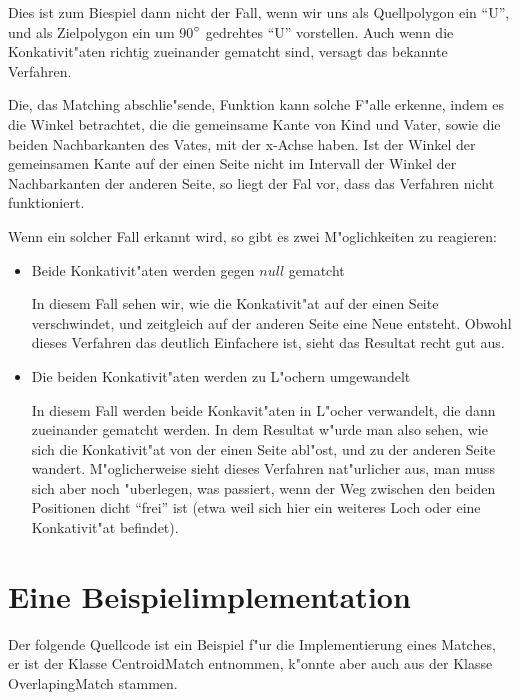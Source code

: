 Dies ist zum Biespiel dann nicht der Fall, wenn wir uns als Quellpolygon ein "`U"', und als Zielpolygon ein um 90$\degree$ gedrehtes "`U"' vorstellen. Auch wenn die Konkativit"aten richtig zueinander gematcht sind, versagt das bekannte Verfahren.

Die, das Matching abschlie"sende, Funktion kann solche F"alle erkenne, indem es die Winkel betrachtet, die die gemeinsame Kante von Kind und Vater, sowie die beiden Nachbarkanten des Vates, mit der x-Achse haben. Ist der Winkel der gemeinsamen Kante auf der einen Seite nicht im  Intervall der Winkel der Nachbarkanten der anderen Seite, so liegt der Fal vor, dass das Verfahren nicht funktioniert.

Wenn ein solcher Fall erkannt wird, so gibt es zwei M"oglichkeiten zu reagieren:
\begin{itemize}
\item Beide Konkativit"aten werden gegen $null$ gematcht

In diesem Fall sehen wir, wie die Konkativit"at auf der einen Seite verschwindet, und zeitgleich auf der anderen Seite eine Neue entsteht. Obwohl dieses Verfahren das deutlich Einfachere ist, sieht das Resultat recht gut aus.

\item Die beiden Konkativit"aten werden zu L"ochern umgewandelt

In diesem Fall werden beide Konkavit"aten in L"ocher verwandelt, die dann zueinander gematcht werden. In dem Resultat w"urde man also sehen, wie sich die Konkativit"at von der einen Seite abl"ost, und zu der anderen Seite wandert. M"oglicherweise sieht dieses Verfahren nat"urlicher aus, man muss sich aber noch "uberlegen, was passiert, wenn der Weg zwischen den beiden Positionen dicht "`frei"' ist (etwa weil sich hier ein weiteres Loch oder eine Konkativit"at befindet).

\end{itemize}


\section{Eine Beispielimplementation}

Der folgende Quellcode ist ein Beispiel f"ur die Implementierung eines Matches, er ist der Klasse CentroidMatch entnommen, k"onnte aber auch aus der Klasse OverlapingMatch stammen. 

